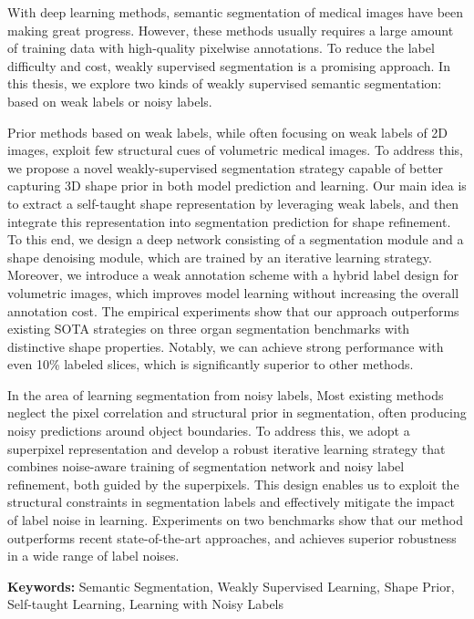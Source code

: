 \begin{abstract*}[flattitle]
With deep learning methods, semantic segmentation of medical images have been making great progress. However, these methods usually requires a large amount of training data with high-quality pixelwise annotations. To reduce the label difficulty and cost, weakly supervised segmentation is a promising approach. In this thesis, we explore two kinds of weakly supervised semantic segmentation: based on weak labels or noisy labels.

Prior methods based on weak labels, while often focusing on weak labels of 2D images, exploit few structural cues of volumetric medical images. To address this, we propose a novel weakly-supervised segmentation strategy capable of better capturing 3D shape prior in both model prediction and learning. Our main idea is to extract a self-taught shape representation by leveraging weak labels, and then integrate this representation into segmentation prediction for shape refinement. To this end, we design a deep network consisting of a segmentation module and a shape denoising module, which are trained by an iterative learning strategy. Moreover, we introduce a weak annotation scheme with a hybrid label design for volumetric images, which improves model learning without increasing the overall annotation cost. The empirical experiments show that our approach outperforms existing SOTA strategies on three organ segmentation benchmarks with distinctive shape properties. Notably, we can achieve strong performance with even 10\% labeled slices, which is significantly superior to other methods. 

In the area of learning segmentation from noisy labels, Most existing methods neglect the pixel correlation and structural prior in segmentation, often producing noisy predictions around object boundaries. To address this, we adopt a superpixel representation and develop a robust iterative learning strategy that combines noise-aware training of segmentation network and noisy label refinement, both guided by the superpixels. This design enables us to exploit the structural constraints in segmentation labels and effectively mitigate the impact of label noise in learning. Experiments on two benchmarks show that our method outperforms recent state-of-the-art approaches, and achieves superior robustness in a wide range of label noises.

\textbf{Keywords: } Semantic Segmentation, Weakly Supervised Learning, Shape Prior, Self-taught Learning, Learning with Noisy Labels

\end{abstract*}